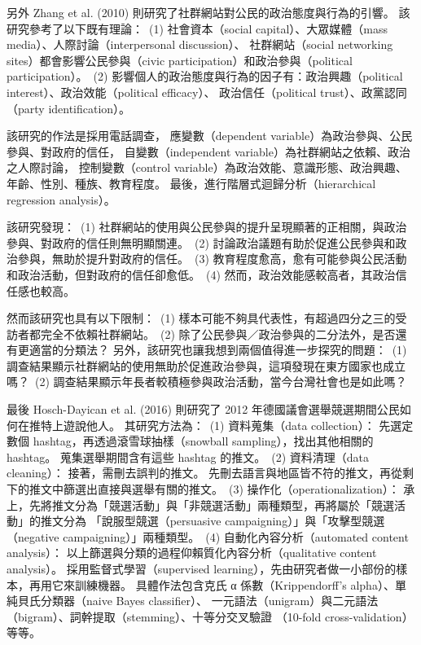 \documentclass[a4paper, 10pt, conference]{ieeeconf}       %
\begin{document}
\begin{CJK}{UTF8}{bsmi}
另外 Zhang et al. (2010) 則研究了社群網站對公民的政治態度與行為的引響。\cite{c2} %
該研究參考了以下既有理論：%
\,(1) 社會資本（social capital）、大眾媒體（mass media）、人際討論（interpersonal discussion）、%
社群網站（social networking sites）都會影響公民參與（civic participation）和政治參與（political participation）。%
\,(2) 影響個人的政治態度與行為的因子有：政治興趣（political interest）、政治效能（political efficacy）、%
政治信任（political trust）、政黨認同（party identification）。%

該研究的作法是採用電話調查，%
應變數（dependent variable）為政治參與、公民參與、對政府的信任，%
自變數（independent variable）為社群網站之依賴、政治之人際討論，%
控制變數（control variable）為政治效能、意識形態、政治興趣、年齡、性別、種族、教育程度。%
最後，進行階層式迴歸分析（hierarchical regression analysis）。%

該研究發現：%
\,(1) 社群網站的使用與公民參與的提升呈現顯著的正相關，與政治參與、對政府的信任則無明顯關連。%
\,(2) 討論政治議題有助於促進公民參與和政治參與，無助於提升對政府的信任。%
\,(3) 教育程度愈高，愈有可能參與公民活動和政治活動，但對政府的信任卻愈低。%
\,(4) 然而，政治效能感較高者，其政治信任感也較高。%

然而該研究也具有以下限制：%
\,(1) 樣本可能不夠具代表性，有超過四分之三的受訪者都完全不依賴社群網站。%
\,(2) 除了公民參與／政治參與的二分法外，是否還有更適當的分類法？%
另外，該研究也讓我想到兩個值得進一步探究的問題：%
\,(1) 調查結果顯示社群網站的使用無助於促進政治參與，這項發現在東方國家也成立嗎？%
\,(2) 調查結果顯示年長者較積極參與政治活動，當今台灣社會也是如此嗎？%

最後 Hosch-Dayican et al. (2016) 則研究了 2012 年德國議會選舉競選期間公民如何在推特上遊說他人。\cite{c3} %
其研究方法為：%
\,(1) 資料蒐集（data collection）：%
先選定數個 hashtag，再透過滾雪球抽樣（snowball sampling），找出其他相關的 hashtag。%
蒐集選舉期間含有這些 hashtag 的推文。%
\,(2) 資料清理（data cleaning）：%
接著，需刪去誤判的推文。%
先刪去語言與地區皆不符的推文，再從剩下的推文中篩選出直接與選舉有關的推文。%
\,(3) 操作化（operationalization）：%
承上，先將推文分為「競選活動」與「非競選活動」兩種類型，再將屬於「競選活動」的推文分為%
「說服型競選（persuasive campaigning）」與「攻擊型競選（negative campaigning）」兩種類型。%
\,(4) 自動化內容分析（automated content analysis）：%
以上篩選與分類的過程仰賴質化內容分析（qualitative content analysis）。%
採用監督式學習（supervised learning），先由研究者做一小部份的樣本，再用它來訓練機器。%
具體作法包含克氏 α 係數（Krippendorff's alpha）、單純貝氏分類器（naive Bayes classifier）、%
一元語法（unigram）與二元語法（bigram）、詞幹提取（stemming）、十等分交叉驗證%
（10-fold cross-validation）等等。%


\end{CJK}
\end{document}

